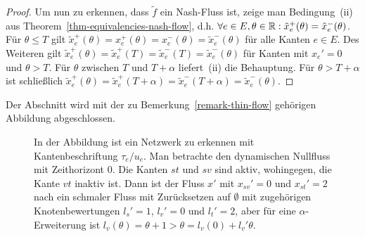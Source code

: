 \begin{proof}
	Um nun zu erkennen, dass $\tilde{f}$ ein Nash-Fluss ist, zeige man Bedingung~(ii) aus Theorem~\ref{thm-equivalencies-nash-flow}, d.h. $\forall e\in E, \theta\in\mathbb{R}: \tilde{x}_e^+(\theta) = \tilde{x}_e^-(\theta)$.
	Für $\theta \leq T$ gilt $\tilde{x}_e^+(\theta) = x_e^+(\theta) = x_e^-(\theta) = \tilde{x}_e^-(\theta)$ für alle Kanten $e\in E$.
	Des Weiteren gilt $\tilde{x}_e^+(\theta) = \tilde{x}_e^+(T) = \tilde{x}_e^-(T) = \tilde{x}_e^-(\theta)$ für Kanten mit $x_{e}' = 0$ und $\theta > T$.
	Für $\theta$ zwischen $T$ und $T+\alpha$ liefert~(ii) die Behauptung.
	Für $\theta > T+\alpha$ ist schließlich $\tilde{x}_e^+(\theta) = \tilde{x}_e^+(T + \alpha) = \tilde{x}_e^-(T+\alpha) = \tilde{x}_e^-(\theta)$.
\end{proof}

Der Abschnitt wird mit der zu Bemerkung~\ref{remark-thin-flow} gehörigen Abbildung abgeschlossen.
\begin{figure}[h!]
	\centering
	\caption{In der Abbildung ist ein Netzwerk zu erkennen mit Kantenbeschriftung $\tau_e / u_e$.
		Man betrachte den dynamischen Nullfluss mit Zeithorizont $0$. 
		Die Kanten $st$ und $sv$ sind aktiv, wohingegen, die Kante $vt$  inaktiv ist.
		Dann ist der Fluss $x'$ mit $x_{sv}'=0$ und $x_{st}'=2$ nach \cite[Definition 6]{Koch2011} ein schmaler Fluss mit Zurücksetzen auf $\emptyset$ mit zugehörigen Knotenbewertungen $l_s' = 1$, $l_v' = 0$ und $l_t' = 2$, aber für eine $\alpha$-Erweiterung ist $l_v(\theta) = \theta + 1 > \theta = l_v(0) + l_v' \theta$.} 
	\label{figure-labels}
\end{figure}